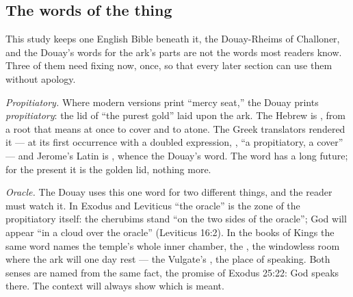 

\subsection{The words of the thing}

This study keeps one English Bible beneath it, the Douay-Rheims of
Challoner, and the Douay's words for the ark's parts are not the words most
readers know. Three of them need fixing now, once, so that every later
section can use them without apology.

\emph{Propitiatory.} Where modern versions print ``mercy seat,'' the Douay
prints \emph{propitiatory}: the lid of ``the purest gold'' laid upon the
ark. The Hebrew is , from a root that means at once to cover
and to atone. The Greek translators rendered it  --- at
its first occurrence with a doubled expression, ,
``a propitiatory, a cover'' --- and Jerome's Latin is ,
whence the Douay's word. The word has a long future;
for the present it is the golden lid, nothing more.

\emph{Oracle.} The Douay uses this one word for two different things, and
the reader must watch it. In Exodus and Leviticus ``the oracle'' is the zone
of the propitiatory itself: the cherubims stand ``on the two sides of the
oracle''; God will appear ``in a cloud over the oracle'' (Leviticus 16:2).
In the books of Kings the same word names the temple's whole inner chamber,
the , the windowless room where the ark will one day rest ---
the Vulgate's , the place of speaking. Both senses are named from the same fact, the
promise of Exodus 25:22: God speaks there. The context will always show
which is meant.

